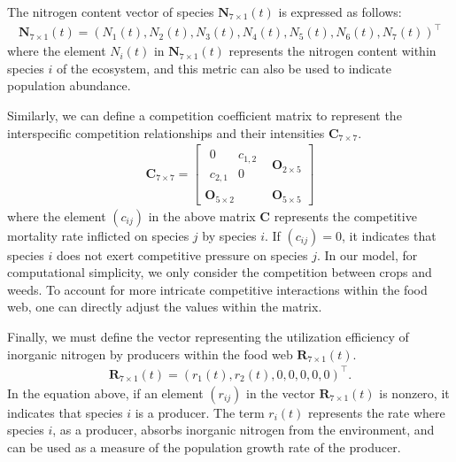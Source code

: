 \documentclass{mcmthesis}
\begin{document}
The nitrogen content vector of species $\mathbf{N}_{7\times1}(t)$ is expressed as follows:
\begin{align*}
    \mathbf{N}_{7\times1}(t) = (N_1(t) , N_2(t) , N_3(t) , N_4(t) , N_5(t) , N_6(t) , N_7(t) )^\intercal
\end{align*}
where the element $N_i(t)$ in $\mathbf{N}_{7\times1}(t)$ represents the nitrogen content within species $i$ of the ecosystem, and this metric can also be used to indicate population abundance.

Similarly, we can define a competition coefficient matrix to represent the interspecific competition relationships and their intensities $\mathbf{C}_{7\times7}$.
\begin{align*}
\mathbf{C}_{7\times7} = 
    \begin{bmatrix}
        \begin{matrix} 0 & c_{1,2} \\ c_{2,1} & 0 \end{matrix} & \mathbf{O}_{2\times5} \\
        \mathbf{O}_{5\times2} & \mathbf{O}_{5\times5}
    \end{bmatrix}
\end{align*}
where the element $(c_{ij})$ in the above matrix $\mathbf{C}$ represents the competitive mortality rate inflicted on species $j$ by species $i$. If $(c_{ij}) = 0$, it indicates that species $i$ does not exert competitive pressure on species $j$. In our model, for computational simplicity, we only consider the competition between crops and weeds. To account for more intricate competitive interactions within the food web, one can directly adjust the values within the matrix.

Finally, we must define the vector representing the utilization efficiency of inorganic nitrogen by producers within the food web $\mathbf{R}_{7\times1}(t)$.
\begin{align*}
    \mathbf{R}_{7\times1}(t) = (r_1(t), r_2(t), 0,0,0,0,0)^\intercal.
\end{align*}
In the equation above, if an element $(r_{ij})$ in the vector $\mathbf{R}_{7\times1}(t)$ is nonzero, it indicates that species $i$ is a producer. The term $r_i(t)$ represents the rate where species $i$, as a producer, absorbs inorganic nitrogen from the environment, and can be used as a measure of the population growth rate of the producer.
\end{document}
